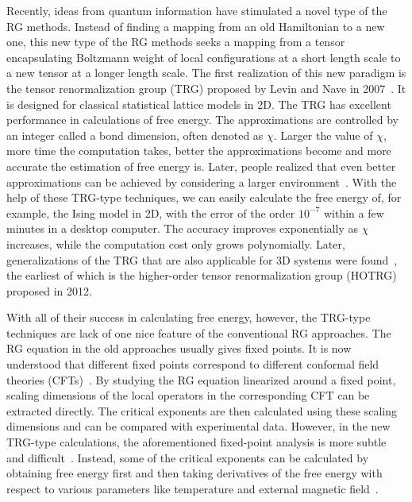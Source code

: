 \documentclass[aps,prb,reprint,superscriptaddress,floatfix]{revtex4-2}
\begin{document}
Recently, ideas from quantum information have stimulated a novel type of
the RG methods. Instead of finding a mapping from an old Hamiltonian to
a new one, this new type of the RG methods seeks a mapping from a tensor
encapsulating Boltzmann weight of local configurations at a short length
scale to a new tensor at a longer length scale. The first realization of
this new paradigm is the tensor renormalization group (TRG) proposed by
Levin and Nave in 2007~\cite{trg}. It is designed for classical
statistical lattice models in 2D.  The TRG has excellent performance in
calculations of free energy. The approximations are controlled by an
integer called a bond dimension, often denoted as $\chi$. Larger the
value of $\chi$, more time the computation takes, better the
approximations become and more accurate the estimation of free energy
is. Later, people realized that even better approximations can be
achieved by considering a larger
environment~\cite{SRGa,SRGb,hotrg,morita2020global}. With the help of
these TRG-type techniques, we can easily calculate the free energy of,
for example, the Ising model in 2D, with the error of the order
$10^{-7}$ within a few minutes in a desktop computer. The accuracy
improves exponentially as $\chi$ increases, while the computation cost
only grows polynomially. Later, generalizations of the TRG that are also
applicable for 3D systems were found~\cite{hotrg,atrg,triadtrg}, the
earliest of which is the higher-order tensor renormalization group
(HOTRG)~\cite{hotrg} proposed in 2012.
%

With all of their success in calculating free energy, however, the
TRG-type techniques are lack of one nice feature of the conventional RG
approaches. The RG equation in the old approaches usually gives fixed
points. It is now understood that different fixed points correspond to
different conformal field theories
(CFTs)~\cite{polchinski1988,nakayama2015}. By studying the RG equation
linearized around a fixed point, scaling dimensions of the local
operators in the corresponding CFT can be extracted directly. The
critical exponents are then calculated using these scaling dimensions
and can be compared with experimental data. However, in the new TRG-type
calculations, the aforementioned fixed-point analysis is more subtle and
difficult~\cite{kadanoff2014}.  Instead, some of the critical exponents
can be calculated by obtaining free energy first and then taking
derivatives of the free energy with respect to various parameters like
temperature and external magnetic field~\cite{hotrg,
Berker2008,xiang2019adtrg}. 
%
\end{document}
